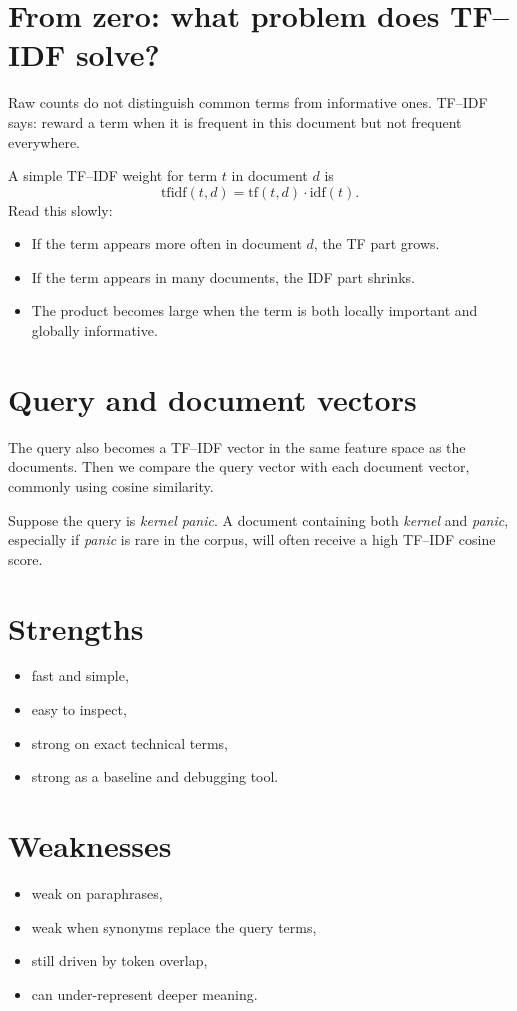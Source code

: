 \documentclass[11pt,oneside]{report}
\begin{document}
\section*{From zero: what problem does TF--IDF solve?}
Raw counts do not distinguish common terms from informative ones. TF--IDF says: reward a term when it is frequent in this document but not frequent everywhere.

\begin{formulabox}
A simple TF--IDF weight for term $t$ in document $d$ is
\[
\mathrm{tfidf}(t,d)=\mathrm{tf}(t,d)\cdot \mathrm{idf}(t).
\]
Read this slowly:
\begin{itemize}
\item If the term appears more often in document $d$, the TF part grows.
\item If the term appears in many documents, the IDF part shrinks.
\item The product becomes large when the term is both locally important and globally informative.
\end{itemize}
\end{formulabox}

\section*{Query and document vectors}
The query also becomes a TF--IDF vector in the same feature space as the documents. Then we compare the query vector with each document vector, commonly using cosine similarity.

\begin{examplebox}
Suppose the query is \emph{kernel panic}. A document containing both \emph{kernel} and \emph{panic}, especially if \emph{panic} is rare in the corpus, will often receive a high TF--IDF cosine score.
\end{examplebox}

\section*{Strengths}
\begin{itemize}
\item fast and simple,
\item easy to inspect,
\item strong on exact technical terms,
\item strong as a baseline and debugging tool.
\end{itemize}

\section*{Weaknesses}
\begin{itemize}
\item weak on paraphrases,
\item weak when synonyms replace the query terms,
\item still driven by token overlap,
\item can under-represent deeper meaning.
\end{itemize}
\end{document}
